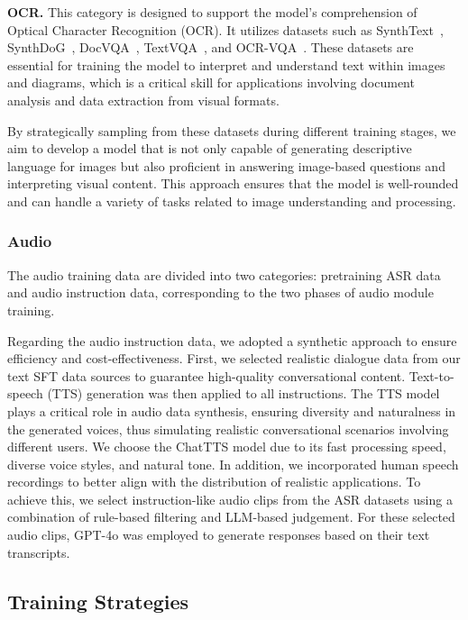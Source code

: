 \textbf{OCR.} This category is designed to support the model's comprehension of Optical Character Recognition (OCR). It utilizes datasets such as SynthText~\cite{gupta2016synthtext}, SynthDoG~\cite{kim2022ocr}, DocVQA~\cite{mathew2021docvqa}, TextVQA~\cite{singh2019textvqa}, and OCR-VQA~\cite{mishra2019ocrvqa}. These datasets are essential for training the model to interpret and understand text within images and diagrams, which is a critical skill for applications involving document analysis and data extraction from visual formats.

By strategically sampling from these datasets during different training stages, we aim to develop a model that is not only capable of generating descriptive language for images but also proficient in answering image-based questions and interpreting visual content. This approach ensures that the model is well-rounded and can handle a variety of tasks related to image understanding and processing.



\subsubsection{Audio}

The audio training data are divided into two categories: pretraining ASR data and audio instruction data, corresponding to the two phases of audio module training. 

Regarding the audio instruction data, we adopted a synthetic approach to ensure efficiency and cost-effectiveness. First, we selected realistic dialogue data from our text SFT data sources to guarantee high-quality conversational content. Text-to-speech (TTS) generation was then applied to all instructions. The TTS model plays a critical role in audio data synthesis, ensuring diversity and naturalness in the generated voices, thus simulating realistic conversational scenarios involving different users. We choose the ChatTTS model due to its fast processing speed, diverse voice styles, and natural tone. In addition, we incorporated human speech recordings to better align with the distribution of realistic applications. To achieve this, we select instruction-like audio clips from the ASR datasets using a combination of rule-based filtering and LLM-based judgement. For these selected audio clips, GPT-4o was employed to generate responses based on their text transcripts. 

\subsection{Training Strategies}
    


